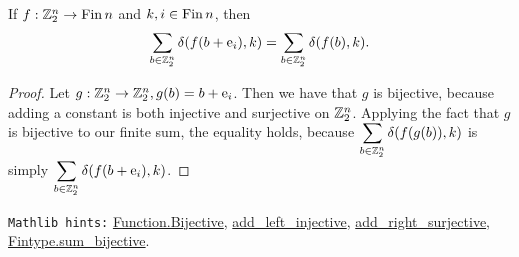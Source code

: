 \bigskip

\begin{lemma}
\label{fun_shift_sum_rev}
\leanok
 If $f:\mathbb{Z}_2^n \to \mathrm{Fin}\, n$ and $k,i\in\mathrm{Fin}\, n$, then
$$\sum_{b\in\mathbb{Z}_2^n} \delta(f(b+{\rm e}_i),k) = \sum_{b\in\mathbb{Z}_2^n} \delta(f(b),k).$$
\end{lemma}

\begin{proof}
\leanok
{\B Let} $ g: \mathbb{Z}_2^n \to \mathbb{Z}_2^n, g(b) = b + {\rm e}_i$. Then we {\B have} that $g$ is {\B bijective}, because adding a constant is both {\B injective} and {\B surjective} on $\mathbb{Z}_2^n$. {\B Applying} the fact that $g$ is {\B bijective} to our {\B finite} sum, the equality holds, because $\displaystyle\sum_{b\in\mathbb{Z}_2^n} \delta(f(g(b)),k)$ is {\B simply} $\displaystyle\sum_{b\in\mathbb{Z}_2^n}\delta(f(b + {\rm e}_i),k)$.
\end{proof}

\noindent\verb|Mathlib hints:| \href{https://leanprover-community.github.io/mathlib4_docs/Mathlib/Logic/Function/Defs.html#Function.Bijective}{Function.Bijective}, \href{https://leanprover-community.github.io/mathlib4_docs/Mathlib/Algebra/Group/Semigroup.html#add_left_injective}{add\_left\_injective}, \href{https://leanprover-community.github.io/mathlib4_docs/Mathlib/Algebra/Group/Basic.html#add_right_surjective}{add\_right\_surjective}, \href{https://leanprover-community.github.io/mathlib4_docs/Mathlib/Algebra/BigOperators/Group/Finset/Defs.html#Fintype.sum_bijective}{Fintype.sum\_bijective}.
